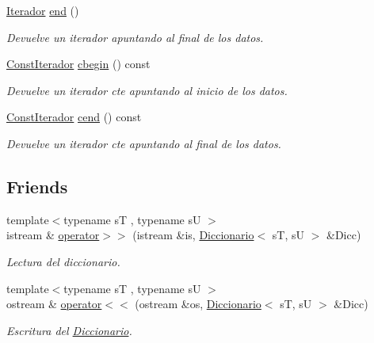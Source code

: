 \begin{DoxyCompactItemize}
\hyperlink{classDiccionario_1_1Iterador}{Iterador} \hyperlink{classDiccionario_acbb1820c2df57594ad102183d77e5331}{end} ()
\begin{DoxyCompactList}\small\item\em Devuelve un iterador apuntando al final de los datos. \end{DoxyCompactList}\item 
\hyperlink{classDiccionario_1_1ConstIterador}{Const\+Iterador} \hyperlink{classDiccionario_a497a853fff023e53eeccba5e80c96a50}{cbegin} () const
\begin{DoxyCompactList}\small\item\em Devuelve un iterador cte apuntando al inicio de los datos. \end{DoxyCompactList}\item 
\hyperlink{classDiccionario_1_1ConstIterador}{Const\+Iterador} \hyperlink{classDiccionario_ad1e6e51c6a40b96d23d41cd2b67706db}{cend} () const
\begin{DoxyCompactList}\small\item\em Devuelve un iterador cte apuntando al final de los datos. \end{DoxyCompactList}\end{DoxyCompactItemize}
\subsection*{Friends}
\begin{DoxyCompactItemize}
\item 
{\footnotesize template$<$typename sT , typename sU $>$ }\\istream \& \hyperlink{classDiccionario_af7dfe37556742720054f190ae78cc676}{operator$>$$>$} (istream \&is, \hyperlink{classDiccionario}{Diccionario}$<$ sT, sU $>$ \&Dicc)
\begin{DoxyCompactList}\small\item\em Lectura del diccionario. \end{DoxyCompactList}\item 
{\footnotesize template$<$typename sT , typename sU $>$ }\\ostream \& \hyperlink{classDiccionario_a081f33124f659cc1fcd76601c3ffea6c}{operator$<$$<$} (ostream \&os, \hyperlink{classDiccionario}{Diccionario}$<$ sT, sU $>$ \&Dicc)
\begin{DoxyCompactList}\small\item\em Escritura del \hyperlink{classDiccionario}{Diccionario}. \end{DoxyCompactList}\end{DoxyCompactItemize}


